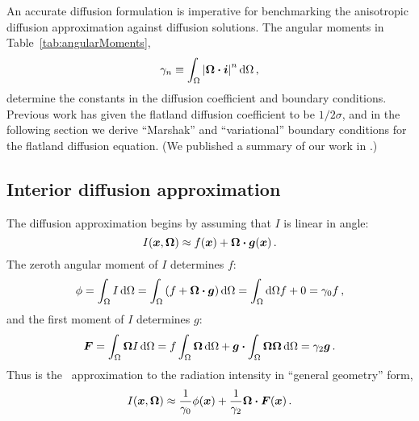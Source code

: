 An accurate diffusion formulation
is imperative for benchmarking the anisotropic diffusion
approximation against diffusion solutions.
The angular moments in Table~\ref{tab:angularMoments},
\begin{equation*}
  \gamma_n \equiv \int_\Omega \left| \bm{\Omega} \bm{\cdot} \bm{i} \right|^n \mathop{}\!\mathrm{d} \Omega\,,
\end{equation*}
determine the constants in the diffusion coefficient and boundary conditions.
Previous work has given the flatland diffusion coefficient to be $1/2\sigma$,
and in the following section we derive ``Marshak'' and ``variational'' boundary
conditions for the flatland diffusion equation. (We published a summary of
our work in \cite{Joh2011a}.)

\subsection{Interior diffusion approximation}

The diffusion approximation begins by assuming that $I$ is linear in angle:
\begin{equation*}
  I(\bm{x}, \bm{\Omega}) \approx f(\bm{x}) + \bm{\Omega} \bm{\cdot}
  \bm{g}(\bm{x})\,.
\end{equation*}
The zeroth angular moment of $I$ determines $f$:
\begin{equation*}
  \phi = \int_\Omega I \mathop{}\!\mathrm{d} \Omega
= \int_\Omega \left( f + \bm{\Omega}\bm{\cdot} \bm{g} \right) \mathop{}\!\mathrm{d}\Omega
= \int_\Omega\mathop{}\!\mathrm{d}\Omega f + 0
= \gamma_0 f \,,
\end{equation*}
and the first moment of $I$ determines $g$:
\begin{equation*}
  \bm{F} = \int_\Omega \bm{\Omega} I \mathop{}\!\mathrm{d} \Omega
= f \int_\Omega \bm{\Omega} \mathop{}\!\mathrm{d}\Omega
  + \bm{g} \bm{\cdot} \int_\Omega \bm{\Omega}\bm{\Omega} \mathop{}\!\mathrm{d}\Omega
= \gamma_2 \bm{g} \,.
\end{equation*}
Thus is the \Pone\ approximation to the radiation intensity in ``general
geometry'' form,
\begin{equation}\label{eq:ssPone}
  I(\bm{x}, \bm{\Omega})
  \approx \frac{1}{\gamma_0} \phi(\bm{x})
  + \frac{1}{\gamma_2} \bm{\Omega} \bm{\cdot} \bm{F}(\bm{x})\,.
\end{equation}

